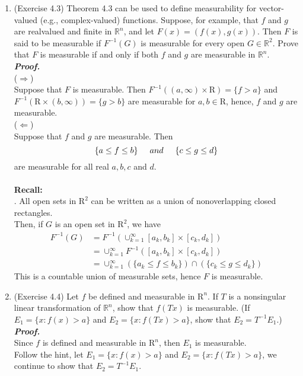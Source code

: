 \documentclass[a4paper,11pt]{article}
\begin{document}
\begin{enumerate}
\item (Exercise 4.3)
Theorem 4.3 can be used to define measurability for vector-valued (e.g.,
complex-valued) functions. Suppose, for example, that $f$ and $g$ are realvalued
and finite in $\mathbb{R}^n$, and let $F(x) = (f(x), g(x))$. Then $F$ is said to be measurable if $F^{-1}(G)$ is measurable for every open $G \in \mathbb{R}^2$. Prove that $F$ is measurable if and only if both $f$ and $g$ are measurable in $\mathbb{R}^n$.\\
\newline
\textit{\textbf {Proof.}}\\
($\Rightarrow$)\\
Suppose that $F$ is measurable. Then $F^{-1}((a,\infty) \times \mathrm{R}) = \{ f > a \}$ and $F^{-1}(\mathrm{R} \times (b,\infty)) = \{ g > b \}$ are measurable for $a,b \in \mathrm{R}$, hence, $f$ and $g$ are measurable.\\

($\Leftarrow$)\\
Suppose that $f$ and $g$ are measurable. Then
$$\{ a \leq f \leq b \} \hspace{0.5 cm} \mathnormal{and} \hspace{0.5cm} \{ c \leq g \leq d \}$$
are measurable for all real $a,b,c$ and $d$.\\\\
\textbf{Recall: }\\
.\hspace{1cm} All open sets in $\mathrm{R}^2$ can be written as a union of nonoverlapping closed rectangles.\\
Then, if $G$ is an open set in $\mathrm{R}^2$, we have\\
$$\begin{aligned}
F^{-1}(G) 
&= F^{-1} \left( \cup_{k=1}^{\infty} [a_k,b_k] \times [c_k,d_k] \right)\\
&= \cup_{k=1}^{\infty} F^{-1} ([a_k,b_k] \times [c_k,d_k])\\
&= \cup_{k=1}^{\infty} (\{ a_k \leq f \leq b_k\}) \cap (\{ c_k \leq g \leq d_k \})
\end{aligned}$$
This is a countable union of measurable sets, hence $F$ is measurable.
\newline






\item (Exercise 4.4)
Let $f$ be defined and measurable in $\mathrm{R}^n$. If $T$ is a nonsingular linear transformation of $\mathbb{R}^n$, show that $f(Tx)$ is measurable. (If $E_1 = \{ x:f(x) >a\}$ and $E_2 = \{ x:f(Tx) >a \}$, show that $E_2=T^{-1}E_1$.)\\
\newline
\textit{\textbf {Proof.}}\\
Since $f$ is defined and measurable in $\mathrm{R}^n$, then $E_1$ is measurable.\\
Follow the hint, let $E_1 = \{ x:f(x) >a\}$ and $E_2 = \{ x:f(Tx) >a \}$, we continue to show that $E_2=T^{-1}E_1$.


\end{enumerate}
\end{document}
